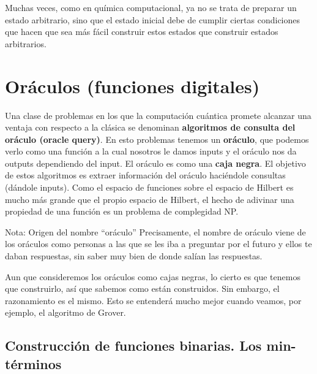 \documentclass[a4paper,11pt]{book} %
\numberwithin{equation}{chapter}
\begin{document}
Muchas veces, como en química computacional, ya no se trata de preparar un estado arbitrario, sino que el estado inicial debe de cumplir ciertas condiciones que hacen que sea más fácil construir estos estados que construir estados arbitrarios.

    
    
    \section{Oráculos (funciones digitales)}

Una clase de problemas en los que la computación cuántica promete alcanzar una ventaja con respecto a la clásica se denominan \textbf{algoritmos de consulta del oráculo (oracle query)}. En esto problemas tenemos un \textbf{oráculo}, que podemos verlo como una función a la cual nosotros le damos inputs y el oráculo nos da outputs dependiendo del input. El oráculo es como una \textbf{caja negra}. El objetivo de estos algoritmos es extraer información del oráculo haciéndole consultas (dándole inputs). Como el espacio de funciones sobre el espacio de Hilbert es mucho más grande que el propio espacio de Hilbert, el hecho de adivinar una propiedad de una función es un problema de complegidad NP.

	\begin{mybox_blue}{Nota: Origen del nombre ``oráculo''}
	Precisamente, el nombre de oráculo viene de los oráculos como personas a las que se les iba a preguntar
	por el futuro y ellos te daban respuestas, sin saber muy bien de donde salían las respuestas.
	\end{mybox_blue}

Aun que consideremos los oráculos como cajas negras, lo cierto es que tenemos que construirlo, así que sabemos como están construidos. Sin embargo, el razonamiento es el mismo. Esto se entenderá mucho mejor cuando veamos, por ejemplo, el algoritmo de Grover.


    	\subsection{Construcción de funciones binarias. Los min-términos}
\end{document}
